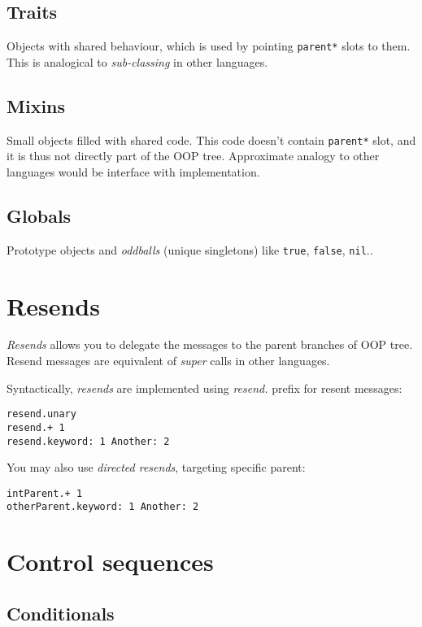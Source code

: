 \documentclass[10pt]{article}
\begin{document}
\begin{multicols*}{3}
\subsection{Traits}
Objects with shared behaviour, which is used by pointing \texttt{parent*} slots to them. This is analogical to \textit{sub-classing} in other languages.



\subsection{Mixins}

Small objects filled with shared code. This code doesn't contain \texttt{parent*} slot, and it is thus not directly part of the OOP tree. Approximate analogy to other languages would be interface with implementation.



\subsection{Globals}
Prototype objects and \textit{oddballs} (unique singletons) like \texttt{true}, \texttt{false}, \texttt{nil}..


\section{Resends}

\textit{Resends} allows you to delegate the messages to the parent branches of OOP tree. Resend messages are equivalent of \textit{super} calls in other languages.

Syntactically, \textit{resends} are implemented using \textit{resend.} prefix for resent messages:

\begin{lstlisting}
resend.unary
resend.+ 1
resend.keyword: 1 Another: 2
\end{lstlisting}

You may also use \textit{directed resends}, targeting specific parent:

\begin{lstlisting}
intParent.+ 1
otherParent.keyword: 1 Another: 2
\end{lstlisting}




\section{Control sequences}
\subsection{Conditionals}


\end{multicols*}
\end{document}
